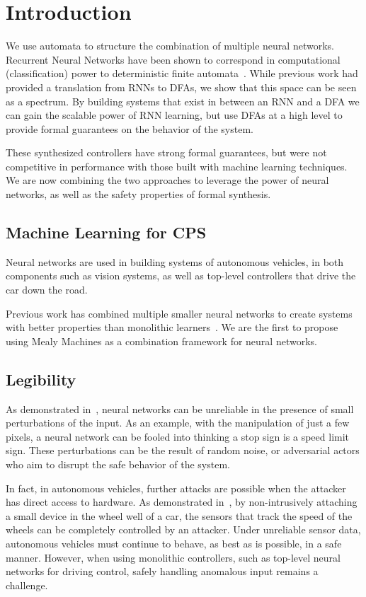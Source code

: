 \section{Introduction}


We use automata to structure the combination of multiple neural networks.
Recurrent Neural Networks have been shown to correspond in computational (classification) power to deterministic finite automata~\cite{tino1998finite}.
While previous work had provided a translation from RNNs to DFAs, we show that this space can be seen as a spectrum.
By building systems that exist in between an RNN and a DFA we can gain the scalable power of RNN learning, but use DFAs at a high level to provide formal guarantees on the behavior of the system.

These synthesized controllers have strong formal guarantees, but were not competitive in performance with those built with machine learning techniques. We are now combining the two approaches to leverage the power of neural networks, as well as the safety properties of formal synthesis.

\subsection{Machine Learning for CPS}

Neural networks are used in building systems of autonomous vehicles, in both components such as vision systems, as well as top-level controllers that drive the car down the road.

Previous work has combined multiple smaller neural networks to create systems with better properties than monolithic learners~\cite{masoudnia2014mixture,baldacchino2016variational}.
We are the first to propose using Mealy Machines as a combination framework for neural networks.

\subsection{Legibility}

As demonstrated in~\cite{DBLP:journals/corr/SzegedyZSBEGF13}, neural networks can be unreliable in the presence of small perturbations of the input.
As an example, with the manipulation of just a few pixels, a neural network can be fooled into thinking a stop sign is a speed limit sign.
These perturbations can be the result of random noise, or adversarial actors who aim to disrupt the safe behavior of the system.

In fact, in autonomous vehicles, further attacks are possible when the attacker has direct access to hardware.
As demonstrated in~\cite{DBLP:journals/iacr/Shoukry0TS15}, by non-intrusively attaching a small device in the wheel well of a car, the sensors that track the speed of the wheels can be completely controlled by an attacker.
Under unreliable sensor data, autonomous vehicles must continue to behave, as best as is possible, in a safe manner.
However, when using monolithic controllers, such as top-level neural networks for driving control, safely handling anomalous input remains a challenge.

